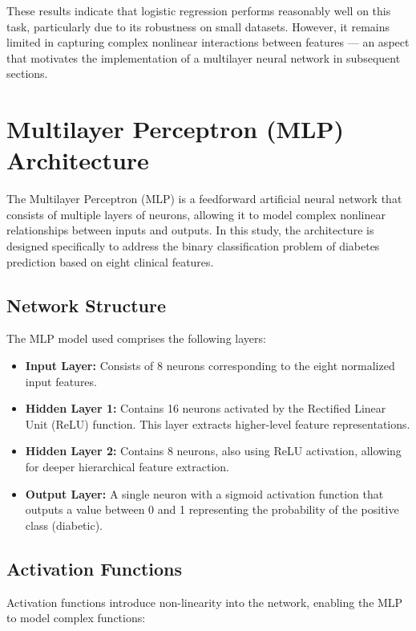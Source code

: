 \documentclass[12pt]{article}
\begin{document}
These results indicate that logistic regression performs reasonably well on this task, particularly due to its robustness on small datasets. However, it remains limited in capturing complex nonlinear interactions between features — an aspect that motivates the implementation of a multilayer neural network in subsequent sections.


\section{Multilayer Perceptron (MLP) Architecture}

The Multilayer Perceptron (MLP) is a feedforward artificial neural network that consists of multiple layers of neurons, allowing it to model complex nonlinear relationships between inputs and outputs. In this study, the architecture is designed specifically to address the binary classification problem of diabetes prediction based on eight clinical features.

\subsection{Network Structure}

The MLP model used comprises the following layers:

\begin{itemize}
    \item \textbf{Input Layer:} Consists of 8 neurons corresponding to the eight normalized input features.
    \item \textbf{Hidden Layer 1:} Contains 16 neurons activated by the Rectified Linear Unit (ReLU) function. This layer extracts higher-level feature representations.
    \item \textbf{Hidden Layer 2:} Contains 8 neurons, also using ReLU activation, allowing for deeper hierarchical feature extraction.
    \item \textbf{Output Layer:} A single neuron with a sigmoid activation function that outputs a value between 0 and 1 representing the probability of the positive class (diabetic).
\end{itemize}

\subsection{Activation Functions}

Activation functions introduce non-linearity into the network, enabling the MLP to model complex functions:
\end{document}
